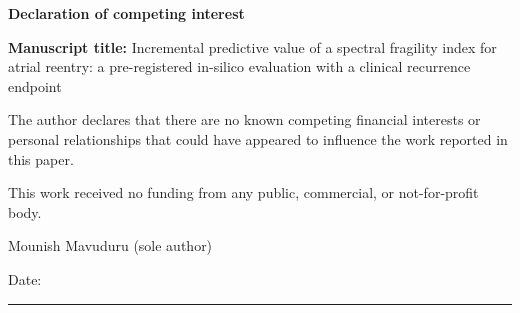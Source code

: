\documentclass[11pt]{article}
\begin{document}
{\large\bfseries Declaration of competing interest}

\textbf{Manuscript title:} Incremental predictive value of a spectral fragility index for atrial reentry: a pre-registered in-silico evaluation with a clinical recurrence endpoint

The author declares that there are no known competing financial interests or personal relationships that could have appeared to influence the work reported in this paper.

This work received no funding from any public, commercial, or not-for-profit body.

\vspace{2em}Mounish Mavuduru (sole author)

Date: \rule{4cm}{0.4pt}
\end{document}
